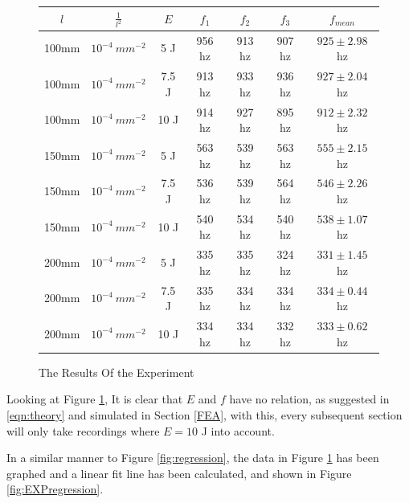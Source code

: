 \documentclass[a4paper,12pt]{article}
\begin{document}
    \begin{figure}[H]%
    \begin{center}
    \begin{tabular}[H]{|c|c|c||c|c|c|c|}
    \hline
    $l$ & $\frac{1}{l^2}$ & $E$ & $f_1$ & $f_2$ & $f_3$ & $f_{mean}$  \\
    \hline\hline
    100mm & $10^{-4}~mm^{-2}$ & 5 J & 956 hz & 913 hz & 907 hz & $925\pm2.98$ hz \\
    \hline
    100mm & $10^{-4}~mm^{-2}$ & 7.5 J & 913 hz & 933 hz & 936 hz & $927\pm2.04$ hz \\
    \hline
    100mm & $10^{-4}~mm^{-2}$ & 10 J & 914 hz & 927 hz & 895 hz &$912\pm2.32$ hz \\
    \hline
    150mm & $10^{-4}~mm^{-2}$ & 5 J & 563 hz & 539 hz & 563 hz &$555\pm2.15$ hz \\
    \hline
    150mm & $10^{-4}~mm^{-2}$ & 7.5 J & 536 hz & 539 hz & 564 hz &$546\pm2.26$ hz \\
    \hline
    150mm & $10^{-4}~mm^{-2}$ & 10 J & 540 hz & 534 hz & 540 hz &$538\pm1.07$ hz \\
    \hline
    200mm & $10^{-4}~mm^{-2}$ & 5 J & 335 hz & 335 hz & 324 hz &$331\pm1.45$ hz \\
    \hline
    200mm & $10^{-4}~mm^{-2}$ & 7.5 J & 335 hz & 334 hz & 334 hz &$334\pm0.44$ hz \\
    \hline
    200mm & $10^{-4}~mm^{-2}$ & 10 J & 334 hz & 334 hz & 332 hz &$333\pm0.62$ hz \\
    \hline
    \end{tabular}
    \end{center}
    \caption{The Results Of the Experiment}\label{fig:TableResults}
    \end{figure}
    Looking at Figure \ref{fig:TableResults}, It is clear that $E$ and $f$ have no relation, as suggested in \eqref{eqn:theory} and simulated in Section \ref{FEA}, with this, every subsequent section will only take recordings where $E=10$ J into account.

    In a similar manner to Figure \ref{fig:regression}, the data in Figure \ref{fig:TableResults} has been graphed and a linear fit line has been calculated, and shown in Figure \ref{fig:EXPregression}.
\end{document}
